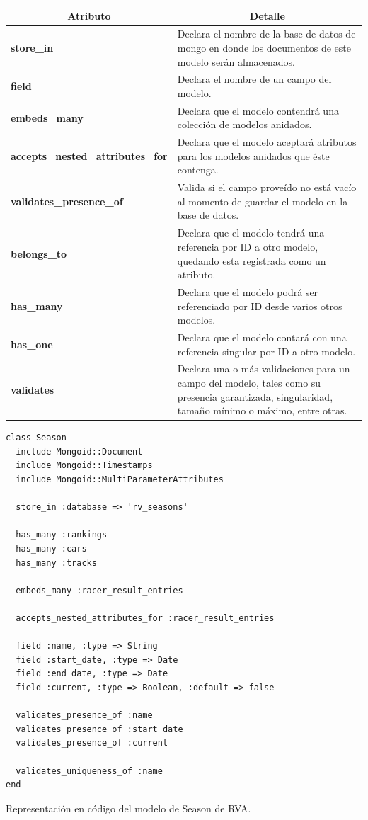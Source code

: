 \begin{center}
  \begin{tabular}{ | p{6cm} | p{11cm} |}
    \hline
    \multicolumn{1}{|c|}{\textbf{Atributo}} & \multicolumn{1}{|c|}{\textbf{Detalle}} \\
    \hline
    
    {\textbf{store\_in}} & Declara el nombre de la base de datos de mongo en donde los documentos de este modelo serán almacenados.\\ \hline
    {\textbf{field}} & Declara el nombre de un campo del modelo. \\ \hline
    {\textbf{embeds\_many}} & Declara que el modelo contendrá una colección de modelos anidados. \\ \hline
    {\textbf{accepts\_nested\_attributes\_for}} & Declara que el modelo aceptará atributos para los modelos anidados que éste contenga. \\ \hline
    {\textbf{validates\_presence\_of}} & Valida si el campo proveído no está vacío al momento de guardar el modelo en la base de datos. \\ \hline
    {\textbf{belongs\_to}} & Declara que el modelo tendrá una referencia por ID a otro modelo, quedando esta registrada como un atributo.
     \\ \hline
    {\textbf{has\_many}} & Declara que el modelo podrá ser referenciado por ID desde varios otros modelos. \\ \hline
    {\textbf{has\_one}} & Declara que el modelo contará con una referencia singular por ID a otro modelo. \\ \hline
    {\textbf{validates}} & Declara una o más validaciones para un campo del modelo, tales como su presencia garantizada, singularidad, tamaño mínimo o máximo, entre otras.\\ \hline
  \end{tabular}
\end{center}

\begin{listing}
  \begin{verbatim}
class Season
  include Mongoid::Document
  include Mongoid::Timestamps
  include Mongoid::MultiParameterAttributes
  
  store_in :database => 'rv_seasons'
  
  has_many :rankings
  has_many :cars
  has_many :tracks
  
  embeds_many :racer_result_entries
  
  accepts_nested_attributes_for :racer_result_entries
  
  field :name, :type => String
  field :start_date, :type => Date
  field :end_date, :type => Date
  field :current, :type => Boolean, :default => false
  
  validates_presence_of :name
  validates_presence_of :start_date
  validates_presence_of :current
  
  validates_uniqueness_of :name
end
  \end{verbatim}
  \caption[Esquema de Season]{Representación en código del modelo de Season de RVA.}
\end{listing}

